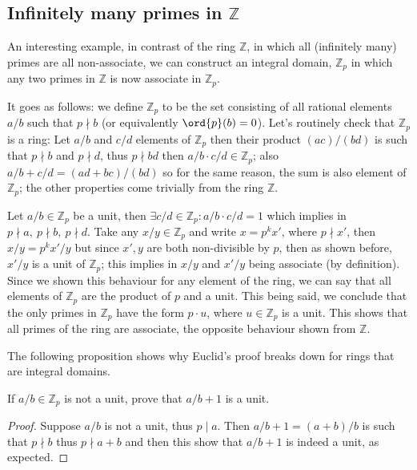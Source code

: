 \subsection{Infinitely many primes in \texorpdfstring{\(\mathbb{Z}\)}{Z}}



\begin{example}
   An interesting example, in contrast of the ring \(\mathbb{Z}\), in which all
   (infinitely many) primes are all non-associate, we can construct an integral
   domain, \(\mathbb{Z}_p\) in which any two primes in \(\mathbb{Z}\) is now
   associate in \(\mathbb{Z}_p\). 

   It goes as follows: we define \(\mathbb{Z}_p\) to be the set consisting of
   all rational elements \(a/b\) such that  \(p \nmid b\) (or equivalently
   \(\ord{p}(b)=0\)). Let's routinely check that \(\mathbb{Z}_p\) is a ring: Let
   \(a/b\) and \(c/d\) elements of \(\mathbb{Z}_p\) then their product
   \((ac)/(bd)\) is such that  \(p \nmid b\) and  \(p \nmid d\), thus  \(p \nmid
   bd\) then \(a/b \cdot c/d \in \mathbb{Z}_p\); also \(a/b + c/d = (ad +
   bc)/(bd)\) so for the same reason, the sum is also element of
   \(\mathbb{Z}_p\); the other properties come trivially from the ring
   \(\mathbb{Z}\).

   Let \(a/b \in \mathbb{Z}_p\) be a unit, then \(\exists
   c/d \in \mathbb{Z}_p : a/b \cdot c/d = 1\) which implies in \(p \nmid a,\ p
   \nmid b,\ p \nmid d\). Take any \(x/y \in \mathbb{Z}_p\) and write \(x =
   p^k x'\), where  \(p \nmid x'\), then \(x/y = p^k x'/y\) but since \(x', y\)
   are both non-divisible by \(p\), then as shown before, \(x'/y\) is a unit of
   \(\mathbb{Z}_p\); this implies in \(x/y\) and  \(x'/y\) being associate (by
   definition). Since we shown this behaviour for any element of the ring, we
   can say that all elements of  \(\mathbb{Z}_p\) are the product of \(p\) and a
   unit. This being said, we conclude that the only primes in  \(\mathbb{Z}_p\)
   have the form \(p \cdot u\), where \(u \in \mathbb{Z}_p\) is a unit. This
   shows that all primes of the ring are associate, the opposite behaviour shown
   from \(\mathbb{Z}\).
\end{example}

The following proposition shows why Euclid's proof breaks down for rings that
are integral domains.
\begin{proposition}
   If \(a/b \in \mathbb{Z}_p\) is not a unit, prove that \(a/b + 1\) is a unit. 
\end{proposition}

\begin{proof}
   Suppose \(a/b\) is not a unit, thus \(p \mid a\). Then \(a/b + 1 = (a+b)/b\)
   is such that \(p \nmid b\) thus  \(p \nmid a + b\) and then this show that
   \(a/b + 1\) is indeed a unit, as expected.
\end{proof}
